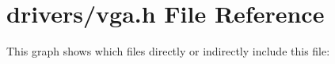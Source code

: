 \hypertarget{a00005}{}\section{drivers/vga.h File Reference}
\label{a00005}
This graph shows which files directly or indirectly include this file\+:
